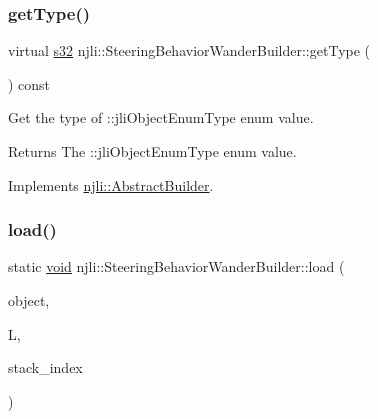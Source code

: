 \mbox{\label{classnjli_1_1_steering_behavior_wander_builder_a639444775e61a75036b1ae87af84d049}} 
\subsubsection{\texorpdfstring{get\+Type()}{getType()}}
{\footnotesize\ttfamily virtual \mbox{\hyperlink{_util_8h_aa62c75d314a0d1f37f79c4b73b2292e2}{s32}} njli\+::\+Steering\+Behavior\+Wander\+Builder\+::get\+Type (\begin{DoxyParamCaption}{ }\end{DoxyParamCaption}) const\hspace{0.3cm}{\ttfamily [virtual]}}

Get the type of \+::jli\+Object\+Enum\+Type enum value.

\begin{DoxyReturn}{Returns}
The \+::jli\+Object\+Enum\+Type enum value. 
\end{DoxyReturn}


Implements \mbox{\hyperlink{classnjli_1_1_abstract_builder_abb4a8161cd71be12807fe85864b67050}{njli\+::\+Abstract\+Builder}}.

\mbox{\label{classnjli_1_1_steering_behavior_wander_builder_ac6ed8b850486ea0d0ee71afb3bbf29ec}} 
\subsubsection{\texorpdfstring{load()}{load()}}
{\footnotesize\ttfamily static \mbox{\hyperlink{_thread_8h_af1e856da2e658414cb2456cb6f7ebc66}{void}} njli\+::\+Steering\+Behavior\+Wander\+Builder\+::load (\begin{DoxyParamCaption}\item[{\mbox{\hyperlink{classnjli_1_1_steering_behavior_wander_builder}{Steering\+Behavior\+Wander\+Builder}} \&}]{object,  }\item[{lua\+\_\+\+State $\ast$}]{L,  }\item[{int}]{stack\+\_\+index }\end{DoxyParamCaption})\hspace{0.3cm}{\ttfamily [static]}}

